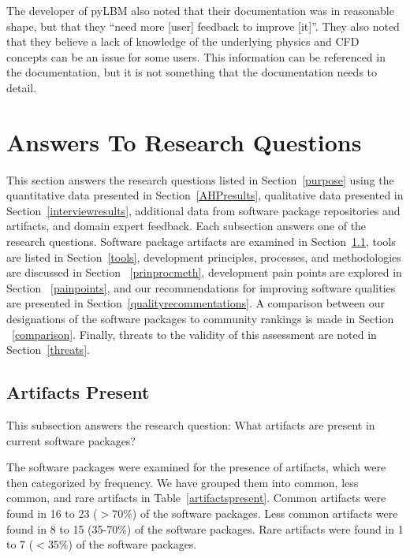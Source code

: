 \documentclass[final, 3p, times, authoryear]{elsarticle}
\begin{document}
The developer of pyLBM also noted that their documentation was in reasonable
shape, but that they ``need more [user] feedback to improve [it]''. They also
noted that they believe a lack of knowledge of the underlying physics and CFD
concepts can be an issue for some users. This information can be referenced in
the documentation, but it is not something that the documentation needs to
detail. 

\section{Answers To Research Questions} \label{answersquestions}

This section answers the research questions listed in Section~\ref{purpose}
using the quantitative data presented in Section~\ref{AHPresults}, qualitative
data presented in Section~\ref{interviewresults}, additional data from software
package repositories and artifacts, and domain expert feedback. Each subsection
answers one of the research questions. Software package artifacts are examined
in Section~\ref{artifacts}, tools are listed in Section~\ref{tools}, development
principles, processes, and methodologies are discussed in Section
~\ref{prinprocmeth}, development pain points are explored in Section
~\ref{painpoints}, and our recommendations for improving software qualities are
presented in Section~\ref{qualityrecommentations}. A comparison between our
designations of the software packages to community rankings is made in Section
~\ref{comparison}. Finally, threats to the validity of this assessment are noted
in Section~\ref{threats}.

\subsection{Artifacts Present} \label{artifacts}

This subsection answers the research question: What artifacts are present in
current software packages?

The software packages were examined for the presence of artifacts, which were
then categorized by frequency. We have grouped them into common, less common,
and rare artifacts in Table~\ref{artifactspresent}. Common artifacts were found
in 16 to 23 ($>$70\%) of the software packages. Less common artifacts were found
in 8 to 15 (35-70\%) of the software packages. Rare artifacts were found in 1 to
7 ($<$35\%) of the software packages. 
\end{document}

